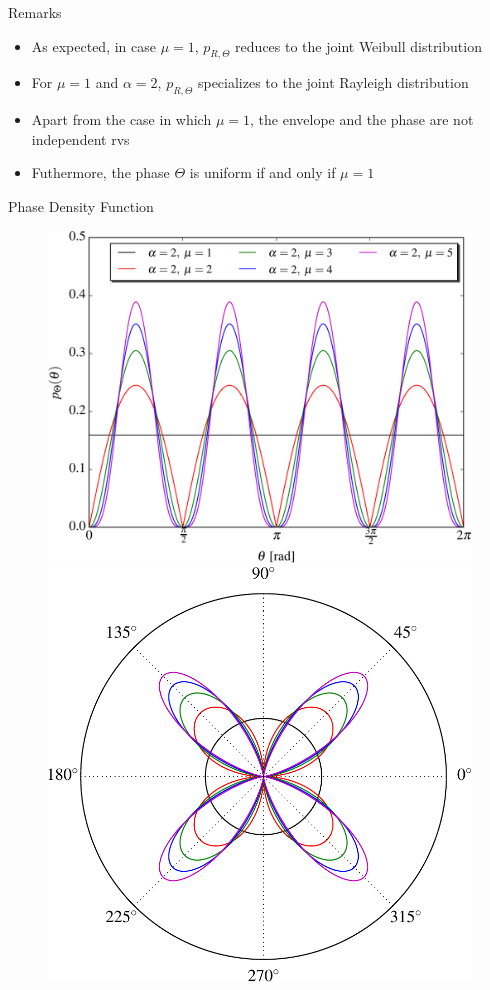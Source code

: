 \documentclass[aspectratio=169]{beamer}
\begin{document}
\begin{frame}{Remarks}
    \begin{itemize}
        \item As expected, in case $\mu = 1$, $p_{R,\Theta}$ reduces to the joint Weibull distribution
        \item For $\mu = 1$ and $\alpha = 2$, $p_{R, \Theta}$ specializes to the joint Rayleigh distribution
        \item Apart from the case in which $\mu = 1$, the envelope and the phase are not independent rvs
        \item Futhermore, the phase $\Theta$ is uniform if and only if $\mu = 1$
    \end{itemize}
\end{frame}

\begin{frame}[plain]{Phase Density Function}
    \begin{figure}
        \includegraphics[scale=0.45]{images/phase_fig_1_linear.pdf}
        \includegraphics[scale=0.45]{images/phase_fig_1.pdf}

\end{figure}
\end{frame}
\end{document}
